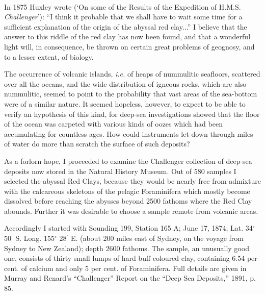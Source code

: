 \documentclass[a4paper, 12pt, oneside]{article}
\begin{document}
\paragraph{}
In 1875 Huxley wrote (`On some of the Results of the Expedition of H.M.S. \emph{Challenger}'): ``I think it probable that we shall have to wait some time for a sufficient explanation of the origin of the abyssal red clay...'' I believe that the answer to this riddle of the red clay has now been found, and that a wonderful light will, in consequence, be thrown on certain great problems of geognosy, and to a lesser extent, of biology.

The occurrence of volcanic islands, \emph{i.e.} of heaps of nummulitic seafloors, scattered over all the oceans, and the wide distribution of igneous rocks, which are also nummulitic, seemed to point to the probability that vast areas of the sea-bottom were of a similar nature. It seemed hopeless, however, to expect to be able to verify an hypothesis of this kind, for deep-sea investigations showed that the floor of the ocean was carpeted with various kinds of oozes which had been accumulating for countless ages. How could instruments let down through miles of water do more than scratch the surface of such deposits?

As a forlorn hope, I proceeded to examine the Challenger collection of deep-sea deposits now stored in the Natural History Museum. Out of 580 samples I selected the abyssal Red Clays, because they would be nearly free from admixture with the calcareous skeletons of the pelagic Foraminifera which mostly become dissolved before reaching the abysses beyond 2500 fathoms where the Red Clay abounds. Further it was desirable to choose a sample remote from volcanic areas.

Accordingly I started with Sounding 199, Station 165 A; June 17, 1874; Lat. 34$^{\circ}$ 50$^{\prime}$ S. Long. 155$^{\circ}$ 28$^{\prime}$ E. (about 200 miles east of Sydney, on the voyage from Sydney to New Zealand); depth 2600 fathoms. The sample, an unusually good one, consists of thirty small lumps of hard buff-coloured clay, containing 6.54 per cent. of calcium and only 5 per cent. of Foraminifera. Full details are given in Murray and Renard's ``Challenger'' Report on the ``Deep Sea Deposits,'' 1891, p. 85.
\end{document}
